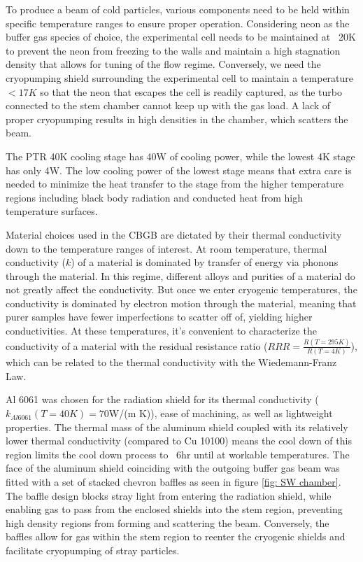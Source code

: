 To produce a beam of cold particles, various components need to be held within specific temperature ranges to ensure proper operation. Considering neon as the buffer gas species of choice, the experimental cell needs to be maintained at ~20K to prevent the neon from freezing to the walls and maintain a high stagnation density that allows for tuning of the flow regime. Conversely, we need the cryopumping shield surrounding the experimental cell to maintain a temperature $<17K$ so that the neon that escapes the cell is readily captured, as the turbo connected to the stem chamber cannot keep up with the gas load. A lack of proper cryopumping results in high densities in the chamber, which scatters the beam.

The PTR 40K cooling stage has 40W of cooling power, while the lowest 4K stage has only 4W. The low cooling power of the lowest stage means that extra care is needed to minimize the heat transfer to the stage from the higher temperature regions including black body radiation and conducted heat from high temperature surfaces.

Material choices used in the CBGB are dictated by their thermal conductivity down to the temperature ranges of interest. At room temperature, thermal conductivity ($k$) of a material is dominated by transfer of energy via phonons through the material. In this regime, different alloys and purities of a material do not greatly affect the conductivity. But once we enter cryogenic temperatures, the conductivity is dominated by electron motion through the material, meaning that purer samples have fewer imperfections to scatter off of, yielding higher conductivities. At these temperatures, it's convenient to characterize the conductivity of a material with the residual resistance ratio ($RRR=\frac{R(T=295K)}{R(T=4K)}$), which can be related to the thermal conductivity with the Wiedemann-Franz Law.\cite{White2009}

Al 6061 was chosen for the radiation shield for its thermal conductivity ($k_{Al6061}(T=40K) = 70$W/(m K)\cite{NIST}), ease of machining, as well as lightweight properties. The thermal mass of the aluminum shield coupled with its relatively lower thermal conductivity (compared to Cu 10100) means the cool down of this region limits the cool down process to ~6hr until at workable temperatures. The face of the aluminum shield coinciding with the outgoing buffer gas beam was fitted with a set of stacked chevron baffles as seen in figure \ref{fig: SW chamber}. The baffle design blocks stray light from entering the radiation shield, while enabling gas to pass from the enclosed shields into the stem region, preventing high density regions from forming and scattering the beam. Conversely, the baffles allow for gas within the stem region to reenter the cryogenic shields and facilitate cryopumping of stray particles.

